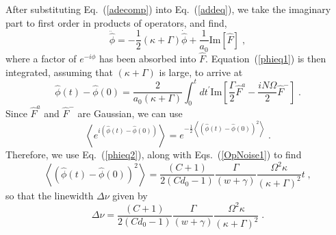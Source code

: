 \documentclass[aps,
twocolumn,
showpacs,
superscriptaddress,groupedaddress]{revtex4}
\begin{document}
After substituting Eq.~(\ref{adecomp}) into Eq.~(\ref{addeq}), we take
the imaginary part to first order in products of operators, and find,
\begin{equation}
\ddot{\hat{\phi}} =
-\frac{1}{2}(\kappa+\Gamma) \dot{\hat{\phi}} +
\frac{1}{a_0} \text{Im} [\hat{F}]\;,
\label{phieq1}
\end{equation}
where a factor of $e^{-i\phi}$ has been absorbed into $\hat{F}$.
Equation~(\ref{phieq1}) is then integrated, assuming that
$(\kappa+\Gamma)$ is large, to arrive at
\begin{equation}
\hat{\phi}(t) - \hat{\phi}(0) =
\frac{2}{a_0 (\kappa+\Gamma)}
\int_0^t dt^{\prime} \text{Im}
\left[ \frac{\Gamma}{2} \hat{F}^a-\frac{i N \Omega}{2} \hat{F}^-\right]\;.
\label{phieq2}
\end{equation}
Since $ \hat{F}^a$ and $\hat{F}^-$ are Gaussian, we can use
\begin{equation}
\left< e^{i(\hat{\phi}(t) - \hat{\phi}(0))} \right> =
e^{-\frac{1}{2}\left< {( \hat{\phi}(t) - \hat{\phi}(0) )}^2 \right>}\;.
\end{equation}
Therefore, we use Eq.~(\ref{phieq2}), along with Eqs.~(\ref{OpNoise1})
to find
\begin{equation}
\left<{(\hat{\phi}(t) - \hat{\phi}(0))}^2 \right> =
\frac{(C+1)}{2(Cd_0-1)} \frac{\Gamma}{(w+\gamma)}
\frac{\Omega^2 \kappa}{{(\kappa+\Gamma)}^2} t\;,
\end{equation}
so that the linewidth $\Delta \nu$ given by
\begin{equation}
\Delta \nu =
\frac{(C+1)}{2(Cd_0-1)} \frac{\Gamma}{(w+\gamma)}
\frac{\Omega^2 \kappa}{{(\kappa+\Gamma)}^2}\;.
\label{LWHaken}
\end{equation}


\end{document}
